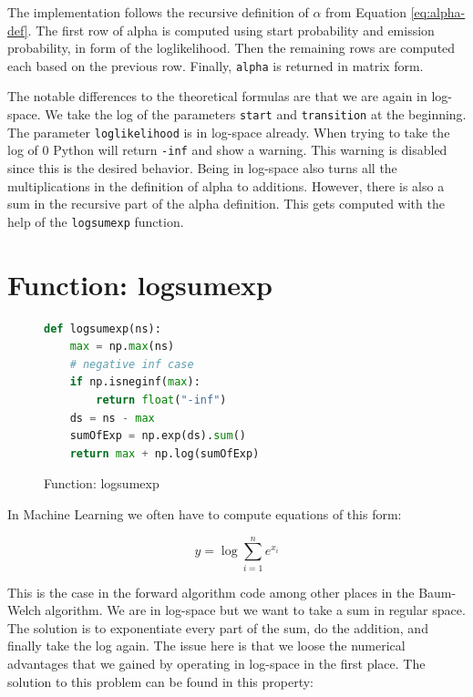 The implementation follows the recursive definition of $\alpha$ from Equation \eqref{eq:alpha-def}. The first row of alpha is computed using start probability and emission probability, in form of the loglikelihood. Then the remaining rows are computed each based on the previous row. Finally, \texttt{alpha} is returned in matrix form. 

The notable differences to the theoretical formulas are that we are again in log-space. We take the log of the parameters \texttt{start} and \texttt{transition} at the beginning. The parameter \texttt{loglikelihood} is in log-space already. When trying to take the log of 0 Python will return \texttt{-inf} and show a warning. This warning is disabled since this is the desired behavior. Being in log-space also turns all the multiplications in the definition of alpha to additions. However, there is also a sum in the recursive part of the alpha definition. This gets computed with the help of the \texttt{logsumexp} function. 

\section{Function: logsumexp}

\begin{figure}
\begin{singlespace}
\begin{lstlisting}[language=Python]
def logsumexp(ns):
    max = np.max(ns)
    # negative inf case
    if np.isneginf(max):
        return float("-inf")
    ds = ns - max
    sumOfExp = np.exp(ds).sum()
    return max + np.log(sumOfExp)

\end{lstlisting}
\end{singlespace}
\caption{Function: logsumexp}    
\label{fig:logsumexp-listing}
\end{figure}

In Machine Learning we often have to compute equations of this form: 

\begin{equation}
y=\log \sum_{i=1}^{n} e^{x_{i}}
\end{equation}

This is the case in the forward algorithm code among other places in the Baum-Welch algorithm. We are in log-space but we want to take a sum in regular space. The solution is to exponentiate every part of the sum, do the addition, and finally take the log again. The issue here is that we loose the numerical advantages that we gained by operating in log-space in the first place. The solution to this problem can be found in this property:

